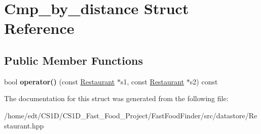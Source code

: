 \hypertarget{structCmp__by__distance}{\section{Cmp\-\_\-by\-\_\-distance Struct Reference}
\label{structCmp__by__distance}
}
\subsection*{Public Member Functions}
\begin{DoxyCompactItemize}
\item 
\hypertarget{structCmp__by__distance_a87a670a5b4dd789722149165c8fe7dfa}{bool {\bfseries operator()} (const \hyperlink{classRestaurant}{Restaurant} $\ast$s1, const \hyperlink{classRestaurant}{Restaurant} $\ast$s2) const }\label{structCmp__by__distance_a87a670a5b4dd789722149165c8fe7dfa}

\end{DoxyCompactItemize}


The documentation for this struct was generated from the following file\-:\begin{DoxyCompactItemize}
\item 
/home/edt/\-C\-S1\-D/\-C\-S1\-D\-\_\-\-Fast\-\_\-\-Food\-\_\-\-Project/\-Fast\-Food\-Finder/src/datastore/Restaurant.\-hpp\end{DoxyCompactItemize}
